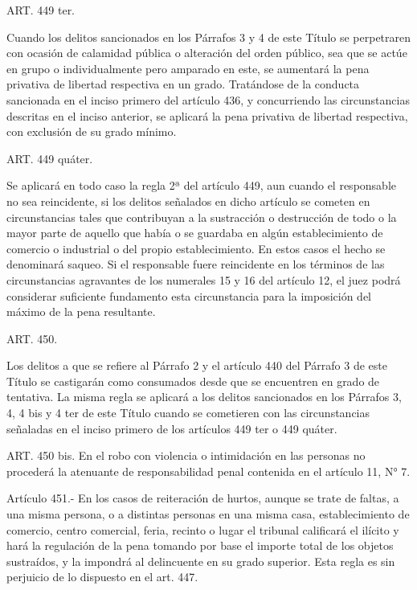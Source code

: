     ART. 449 ter.

    Cuando los delitos sancionados en los Párrafos 3 y 4 de este Título se perpetraren con ocasión de calamidad pública o alteración del orden público, sea que se actúe en grupo o individualmente pero amparado en este, se aumentará la pena privativa de libertad respectiva en un grado.
    Tratándose de la conducta sancionada en el inciso primero del artículo 436, y concurriendo las circunstancias descritas en el inciso anterior, se aplicará la pena privativa de libertad respectiva, con exclusión de su grado mínimo.




    ART. 449 quáter.

    Se aplicará en todo caso la regla 2ª del artículo 449, aun cuando el responsable no sea reincidente, si los delitos señalados en dicho artículo se cometen en circunstancias tales que contribuyan a la sustracción o destrucción de todo o la mayor parte de aquello que había o se guardaba en algún establecimiento de comercio o industrial o del propio establecimiento. En estos casos el hecho se denominará saqueo.
    Si el responsable fuere reincidente en los términos de las circunstancias agravantes de los numerales 15 y 16 del artículo 12, el juez podrá considerar suficiente fundamento esta circunstancia para la imposición del máximo de la pena resultante. 



    ART. 450.

    Los delitos a que se refiere al Párrafo 2 y el artículo 440 del Párrafo 3 de este Título se castigarán como consumados desde que se encuentren en grado de tentativa.
    La misma regla se aplicará a los delitos sancionados en los Párrafos 3, 4, 4 bis y 4 ter de este Título cuando se cometieren con las circunstancias señaladas en el inciso primero de los artículos 449 ter o 449 quáter.
   




    ART. 450 bis.
    En el robo con violencia o intimidación en las personas no procederá la atenuante de responsabilidad penal contenida en el artículo 11, N° 7.

    Artículo 451.- En los casos de reiteración de hurtos, aunque se trate de faltas, a una misma persona, o a distintas personas en una misma casa, establecimiento de comercio, centro comercial, feria, recinto o lugar el tribunal calificará el ilícito y hará la regulación de la pena tomando por base el importe total de los objetos sustraídos, y la impondrá al delincuente en su grado superior.
    Esta regla es sin perjuicio de lo dispuesto en el art. 447.


